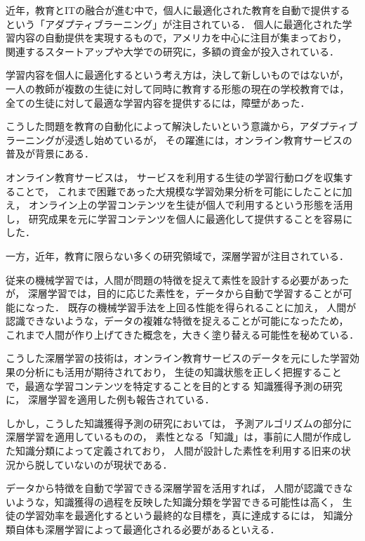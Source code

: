 近年，教育とITの融合が進む中で，個人に最適化された教育を自動で提供するという「アダプティブラーニング」が注目されている．
個人に最適化された学習内容の自動提供を実現するもので，アメリカを中心に注目が集まっており，
関連するスタートアップや大学での研究に，多額の資金が投入されている．

学習内容を個人に最適化するという考え方は，決して新しいものではないが，
一人の教師が複数の生徒に対して同時に教育する形態の現在の学校教育では，
全ての生徒に対して最適な学習内容を提供するには，障壁があった．


こうした問題を教育の自動化によって解決したいという意識から，アダプティブラーニングが浸透し始めているが，
その躍進には，オンライン教育サービスの普及が背景にある．

オンライン教育サービスは，
サービスを利用する生徒の学習行動ログを収集することで，
これまで困難であった大規模な学習効果分析を可能にしたことに加え，
オンライン上の学習コンテンツを生徒が個人で利用するという形態を活用し，
研究成果を元に学習コンテンツを個人に最適化して提供することを容易にした．


一方，近年，教育に限らない多くの研究領域で，深層学習が注目されている．

従来の機械学習では，人間が問題の特徴を捉えて素性を設計する必要があったが，
深層学習では，目的に応じた素性を，データから自動で学習することが可能になった．
既存の機械学習手法を上回る性能を得られることに加え，
人間が認識できないような，データの複雑な特徴を捉えることが可能になったため，
これまで人間が作り上げてきた概念を，大きく塗り替える可能性を秘めている．


こうした深層学習の技術は，オンライン教育サービスのデータを元にした学習効果の分析にも活用が期待されており，
生徒の知識状態を正しく把握することで，最適な学習コンテンツを特定することを目的とする
知識獲得予測の研究に，
深層学習を適用した例も報告されている．

しかし，こうした知識獲得予測の研究においては，
予測アルゴリズムの部分に深層学習を適用しているものの，
素性となる「知識」は，事前に人間が作成した知識分類によって定義されており，
人間が設計した素性を利用する旧来の状況から脱していないのが現状である．

データから特徴を自動で学習できる深層学習を活用すれば，
人間が認識できないような，知識獲得の過程を反映した知識分類を学習できる可能性は高く，
生徒の学習効率を最適化するという最終的な目標を，真に達成するには，
知識分類自体も深層学習によって最適化される必要があるといえる．


